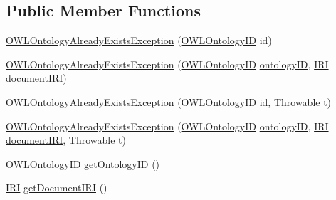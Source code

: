 \subsection*{Public Member Functions}
\begin{DoxyCompactItemize}
\item 
\hyperlink{classorg_1_1semanticweb_1_1owlapi_1_1model_1_1_o_w_l_ontology_already_exists_exception_a7a12136892d383b9a02082aada67a904}{O\-W\-L\-Ontology\-Already\-Exists\-Exception} (\hyperlink{classorg_1_1semanticweb_1_1owlapi_1_1model_1_1_o_w_l_ontology_i_d}{O\-W\-L\-Ontology\-I\-D} id)
\item 
\hyperlink{classorg_1_1semanticweb_1_1owlapi_1_1model_1_1_o_w_l_ontology_already_exists_exception_aadfbfa6749f8f535b762eee3e82d3989}{O\-W\-L\-Ontology\-Already\-Exists\-Exception} (\hyperlink{classorg_1_1semanticweb_1_1owlapi_1_1model_1_1_o_w_l_ontology_i_d}{O\-W\-L\-Ontology\-I\-D} \hyperlink{classorg_1_1semanticweb_1_1owlapi_1_1model_1_1_o_w_l_ontology_already_exists_exception_a459a09b8b7bd53ea758f93cffc08c76e}{ontology\-I\-D}, \hyperlink{classorg_1_1semanticweb_1_1owlapi_1_1model_1_1_i_r_i}{I\-R\-I} \hyperlink{classorg_1_1semanticweb_1_1owlapi_1_1model_1_1_o_w_l_ontology_already_exists_exception_a153a29230e5a16da265d6fcc4899aadd}{document\-I\-R\-I})
\item 
\hyperlink{classorg_1_1semanticweb_1_1owlapi_1_1model_1_1_o_w_l_ontology_already_exists_exception_a1e0bf3480669492152ab7500dd58e661}{O\-W\-L\-Ontology\-Already\-Exists\-Exception} (\hyperlink{classorg_1_1semanticweb_1_1owlapi_1_1model_1_1_o_w_l_ontology_i_d}{O\-W\-L\-Ontology\-I\-D} id, Throwable t)
\item 
\hyperlink{classorg_1_1semanticweb_1_1owlapi_1_1model_1_1_o_w_l_ontology_already_exists_exception_a9ad151d34dcd5dabd65c64c840202605}{O\-W\-L\-Ontology\-Already\-Exists\-Exception} (\hyperlink{classorg_1_1semanticweb_1_1owlapi_1_1model_1_1_o_w_l_ontology_i_d}{O\-W\-L\-Ontology\-I\-D} \hyperlink{classorg_1_1semanticweb_1_1owlapi_1_1model_1_1_o_w_l_ontology_already_exists_exception_a459a09b8b7bd53ea758f93cffc08c76e}{ontology\-I\-D}, \hyperlink{classorg_1_1semanticweb_1_1owlapi_1_1model_1_1_i_r_i}{I\-R\-I} \hyperlink{classorg_1_1semanticweb_1_1owlapi_1_1model_1_1_o_w_l_ontology_already_exists_exception_a153a29230e5a16da265d6fcc4899aadd}{document\-I\-R\-I}, Throwable t)
\item 
\hyperlink{classorg_1_1semanticweb_1_1owlapi_1_1model_1_1_o_w_l_ontology_i_d}{O\-W\-L\-Ontology\-I\-D} \hyperlink{classorg_1_1semanticweb_1_1owlapi_1_1model_1_1_o_w_l_ontology_already_exists_exception_a7f1d6144b1ef42adad281a3a82d7f2a9}{get\-Ontology\-I\-D} ()
\item 
\hyperlink{classorg_1_1semanticweb_1_1owlapi_1_1model_1_1_i_r_i}{I\-R\-I} \hyperlink{classorg_1_1semanticweb_1_1owlapi_1_1model_1_1_o_w_l_ontology_already_exists_exception_a06c51f03502bb4e18eb48bd45985b9b2}{get\-Document\-I\-R\-I} ()
\end{DoxyCompactItemize}
